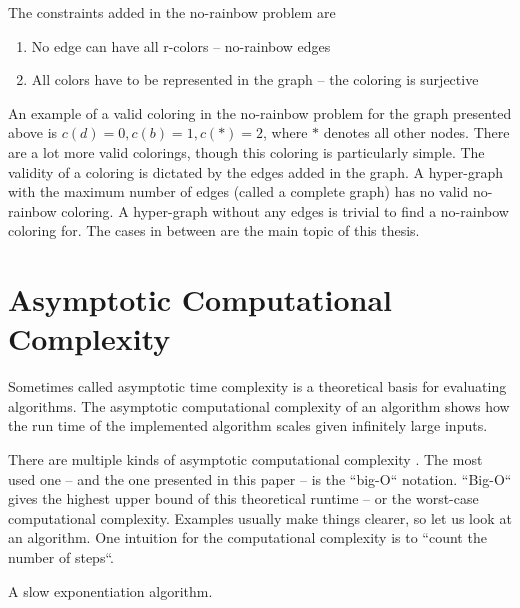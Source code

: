 \documentclass[msc,lith,english]{liuthesis}
\begin{document}
The constraints added in the no-rainbow problem are
\begin{enumerate}
  \item No edge can have all r-colors -- no-rainbow edges
  \item All colors have to be represented in the graph -- the coloring is surjective
\end{enumerate}

An example of a valid coloring in the no-rainbow problem for the graph presented above is $c(d)=0, c(b)=1, c(*)=2$, where $*$ denotes all other nodes.
There are a lot more valid colorings, though this coloring is particularly simple.
The validity of a coloring is dictated by the edges added in the graph.
A hyper-graph with the maximum number of edges (called a complete graph) has no valid no-rainbow coloring.
A hyper-graph without any edges is trivial to find a no-rainbow coloring for.
The cases in between are the main topic of this thesis.

\cite{sourceHyper}

\section{Asymptotic Computational Complexity}
Sometimes called asymptotic time complexity is a theoretical basis for evaluating algorithms.
The asymptotic computational complexity of an algorithm shows how the run time
of the implemented algorithm scales given infinitely large inputs.


There are multiple kinds of asymptotic computational complexity \cite[Chapter 3]{sourceAlgoBook}. The most used
one -- and the one presented in this paper -- is the ``big-O`` notation. ``Big-O``
gives the highest upper bound of this theoretical runtime -- or the worst-case
computational complexity. Examples usually make things clearer, so let us look at an algorithm.
One intuition for the computational complexity is to ``count the number of steps``.

\begin{algorithm}
\caption{A slow exponentiation algorithm.}\label{algDivSlow}
\DontPrintSemicolon
{}

\end{algorithm}
\end{document}
